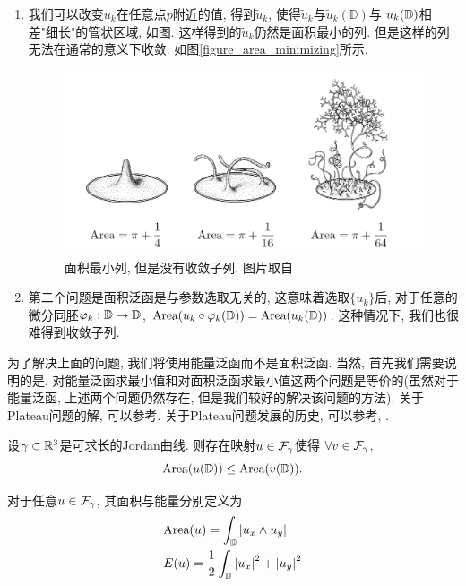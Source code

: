 \begin{enumerate}
    \item 我们可以改变$u_k$在任意点$p$附近的值, 得到$\tilde{u}_k$, 使得$\tilde{u}_k$与$\tilde{u}_k(\mathbb{D})$与 $u_k({\mathbb{D}})$相差"细长"的管状区域, 如图. 这样得到的$\tilde{u}_k$仍然是面积最小的列. 但是这样的列无法在通常的意义下收敛.  如图\eqref{figure_area_minimizing}所示.
    \begin{figure}[ht]
        \centering
        \includegraphics[scale=0.7]{images/area_minimizing.png}
        \caption{面积最小列, 但是没有收敛子列. 图片取自\cite{Morgan}}
        \label{figure_area_minimizing}
    \end{figure}
    \item 第二个问题是面积泛函是与参数选取无关的, 这意味着选取$\{u_k\}$后, 对于任意的微分同胚${\varphi}_k: {\mathbb{D}} \to {\mathbb{D}}$, $\text{Area}(u_k\circ {\varphi}_k({\mathbb{D}}))= \text{Area}(u_k({\mathbb{D}}))$. 这种情况下, 我们也很难得到收敛子列.
\end{enumerate}
为了解决上面的问题, 我们将使用能量泛函而不是面积泛函. 当然, 首先我们需要说明的是, 对能量泛函求最小值和对面积泛函求最小值这两个问题是等价的(虽然对于能量泛函, 上述两个问题仍然存在, 但是我们较好的解决该问题的方法). 关于Plateau问题的解, 可以参考\cite{JostTwo}. 关于Plateau问题发展的历史, 可以参考\cite{FomenkoI}, \cite{FomenkoII}.
\begin{theorem} \label{rado_douglas}
    设$\gamma \subset {\mathbb{R}}^3$是可求长的Jordan曲线. 则存在映射$u \in {\mathcal{F}_\gamma}$使得 $\forall v \in {\mathcal{F}_\gamma}$, 
    \begin{equation}
        \text{Area}(u({\mathbb{D}}))\le \text{Area}(v({\mathbb{D}})).
    \end{equation}
\end{theorem}
对于任意$u \in {\mathcal{F}_\gamma}$, 其面积与能量分别定义为
\begin{align}
    &\text{Area}(u)=\int_{\mathbb{D}}{\left | u_x\wedge u_y \right |} \\
    &{E}(u)=\frac{1}{2}\int_{\mathbb{D}}{\left | u_x \right |}^2+{\left | u_y \right |}^2
\end{align}
